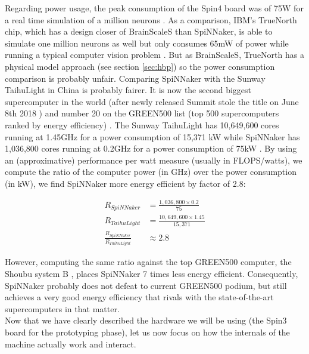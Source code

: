 Regarding power usage, the peak consumption of the Spin4 board was of 75W for a real time simulation of a million neurons \cite{dev-process}. As a comparison, IBM's TrueNorth chip, which has a design closer of BrainScaleS than SpiNNaker, is able to simulate one million neurons as well but only consumes 65mW of power while running a typical computer vision problem \cite{truenorthpaper}. But as BrainScaleS, TrueNorth has a physical model approach (see section \ref{sec:hbp}) so the power consumption comparison is probably unfair. Comparing SpiNNaker with the Sunway TaihuLight in China is probably fairer. It is now the second biggest supercomputer in the world (after newly released Summit stole the title on June 8th 2018 \cite{summit}) and number 20 on the GREEN500 list (top 500 supercomputers ranked by energy efficiency) \cite{green500}. The Sunway TaihuLight has 10,649,600 cores running at 1.45GHz for a power consumption of 15,371 kW \cite{top500} while SpiNNaker has 1,036,800 cores running at 0.2GHz for a power consumption of 75kW \cite{spinnaker}. By using an (approximative) performance per watt measure (usually in FLOPS/watts), we compute the ratio of the computer power (in GHz) over the power consumption (in kW), we find SpiNNaker more energy efficient by factor of 2.8:

\vspace*{-0.3cm}
\begin{equation*}
\begin{split}
R_{SpiNNaker} &= \frac{1,036,800 \times 0.2}{75} \\
R_{TaihuLight} &= \frac{10,649,600 \times 1.45}{15,371} \\
\frac{R_{SpiNNaker}}{R_{TaihuLight}} &\approx 2.8
\end{split}
\end{equation*}

However, computing the same ratio against the top GREEN500 computer, the Shoubu system B \cite{green500}, places SpiNNaker 7 times less energy efficient. Consequently, SpiNNaker probably does not defeat to current GREEN500 podium, but still achieves a very good energy efficiency that rivals with the state-of-the-art supercomputers in that matter. \\

Now that we have clearly described the hardware we will be using (the Spin3 board for the prototyping phase), let us now focus on how the internals of the machine actually work and interact.

